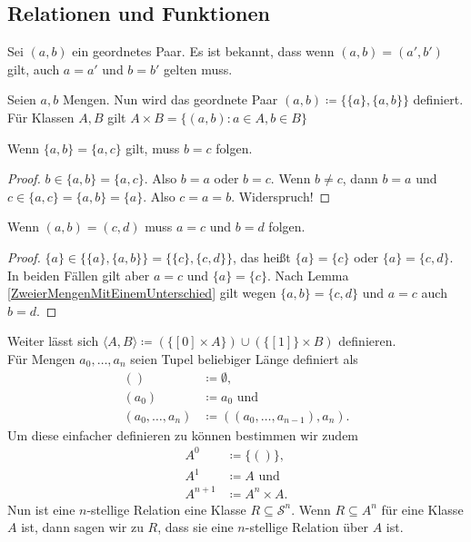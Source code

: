 \subsection{Relationen und Funktionen}

Sei $(a,b)$ ein geordnetes Paar. Es ist bekannt, dass wenn $(a,b)=(a', b')$ gilt, auch $a=a'$ und $b=b'$ gelten muss.

\begin{definition}
	Seien $a, b$ Mengen. Nun wird das geordnete Paar $(a, b)\coloneqq\{\{a\}, \{a,b\}\}$ definiert. Für Klassen $A,B$ gilt $A\times B=\{(a,b):a\in A, b\in B\}$
\end{definition}

\begin{lemma}
	Wenn $\{a,b\}=\{a,c\}$ gilt, muss $b=c$ folgen.
	\label{ZweierMengenMitEinemUnterschied}
\end{lemma}
\begin{proof}
	$b\in \{a,b\}=\{a,c\}$. Also $b=a$ oder $b=c$. Wenn $b\neq c$, dann $b=a$ und $c\in\{a,c\}=\{a,b\}=\{a\}$. Also $c=a=b$. Widerspruch!
\end{proof}

\begin{lemma}
	Wenn $(a,b)=(c,d)$ muss $a=c$ und $b=d$ folgen.
\end{lemma}
\begin{proof}
	$\{a\}\in \{\{a\}, \{a,b\}\}=\{\{c\},\{c,d\}\}$, das heißt $\{a\}=\{c\}$ oder $\{a\}=\{c,d\}$. In beiden Fällen gilt aber $a=c$ und $\{a\}=\{c\}$. Nach Lemma \ref{ZweierMengenMitEinemUnterschied} gilt wegen $\{a,b\}=\{c,d\}$ und $a=c$ auch $b=d$.
\end{proof}

Weiter lässt sich $\langle A, B \rangle\coloneqq(\{[0]\times A\})\cup(\{[1]\}\times B)$ definieren.
\\
Für Mengen $a_0,\dots,a_n$ seien Tupel beliebiger Länge definiert als
\begin{align*}
	()&\coloneqq \emptyset,\\ (a_0)&\coloneqq a_0 \text{ und}\\ (a_0,\dots,a_n)&\coloneqq((a_0,\dots,a_{n-1}), a_n).
\end{align*}
Um diese einfacher definieren zu können bestimmen wir zudem 
\begin{align*}
	A^0&\coloneqq\{()\},\\ A^1&\coloneqq A \text{ und}\\ A^{n+1}&\coloneqq A^n\times A.
\end{align*}
Nun ist eine $n$-stellige Relation eine Klasse $R\subseteq \mathcal{S}^n$. Wenn $R\subseteq A^n$ für eine Klasse $A$ ist, dann sagen wir zu $R$, dass sie eine $n$-stellige Relation über $A$ ist.

